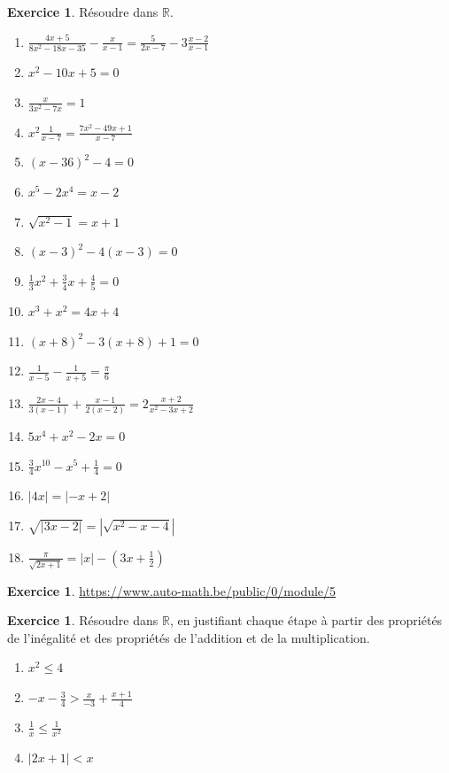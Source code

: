 \documentclass[a4paper,13pt]{scrreprt}
\theoremstyle{plain}
\theoremstyle{definition}
\newtheorem{exo}[subsection]{Exercice}
\newcommand{\rr}{\mathbb{R}}
\begin{document}
\begin{exo} \label{exoei3}
	Résoudre dans $\rr$.
	\begin{enumerate}
		\item $\frac{4x+5}{8x^2-18x-35} - \frac{x}{x-1} = \frac{5}{2x-7}-3\frac{x-2}{x-1}$
		\item $x^2 - 10x + 5=0$
		\item $\frac{x}{3x^2-7x}=1$
		\item $x^2 \frac{1}{x-7} = \frac{7x^2 - 49x +1}{x-7}$
		\item $(x- 36)^2 - 4 = 0$
		\item $x^5 - 2x^4 = x-2$
		\item $\sqrt{x^2-1}=x+1$
		\item $(x-3)^2-4(x-3)=0$
		\item $\frac{1}{3}x^2+\frac{3}{4}x+\frac{4}{5}=0$
		\item $x^3+x^2=4x+4$
		\item $(x+8)^2-3(x+8)+1=0$
		\item $\frac{1}{x-5}-\frac{1}{x+5}=\frac{\pi}{6}$
		\item $\frac{2x-4}{3(x-1)}+\frac{x-1}{2(x-2)}=2 \frac{x+2}{x^2-3x+2}$
		\item $5x^4 + x^2 - 2x=0$
		\item $\frac{3}{4}x^{10} - x^5 + \frac{1}{4}=0$
		\item $|4x| = |-x+2|$
		\item $\sqrt{|3x-2|}= |\sqrt{x^2-x-4}|$
		\item $\frac{\pi}{\sqrt{2x+1}}=|x| - (3x+\frac{1}{2})$
	\end{enumerate}
\end{exo}

\begin{exo} \label{exoei4}
	\url{https://www.auto-math.be/public/0/module/5}
\end{exo}

\begin{exo} \label{exoei5}
	Résoudre dans $\rr$, en justifiant chaque étape à partir des propriétés de l'inégalité et des propriétés de l'addition et de la multiplication.
	\begin{enumerate}
		\item $x^2 \le 4$
		\item $-x - \frac{3}{4} > \frac{x}{-3}+\frac{x+1}{4}$
		\item $\frac{1}{x} \le \frac{1}{x^2}$
		\item $|2x+1| < x$
	\end{enumerate}
\end{exo}
\end{document}
